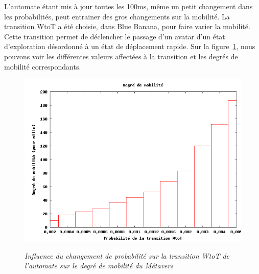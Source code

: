 \par L'automate étant mis à jour toutes les 100ms, même un petit changement dans les probabilités, peut entrainer des gros changements sur la mobilité. La transition WtoT a été choisie, dans Blue Banana, pour faire varier la mobilité. Cette transition permet de déclencher le passage d'un avatar d'un état d'exploration désordonné à un état de déplacement rapide. Sur la figure~\ref{fig:mobility}, nous pouvons voir les différentes valeurs affectées à la transition et les degrés de mobilité correspondants. 

\begin{figure}
  \begin{center}
    \includegraphics[scale=0.55]{./Ressources/Images/mobility.png} \\
    \caption{\textit{\small Influence du changement de probabilité sur
        la transition WtoT de l'automate sur le degré de mobilité du
        Métavers}}
    \label{fig:mobility}
  \end{center}
\end{figure}


